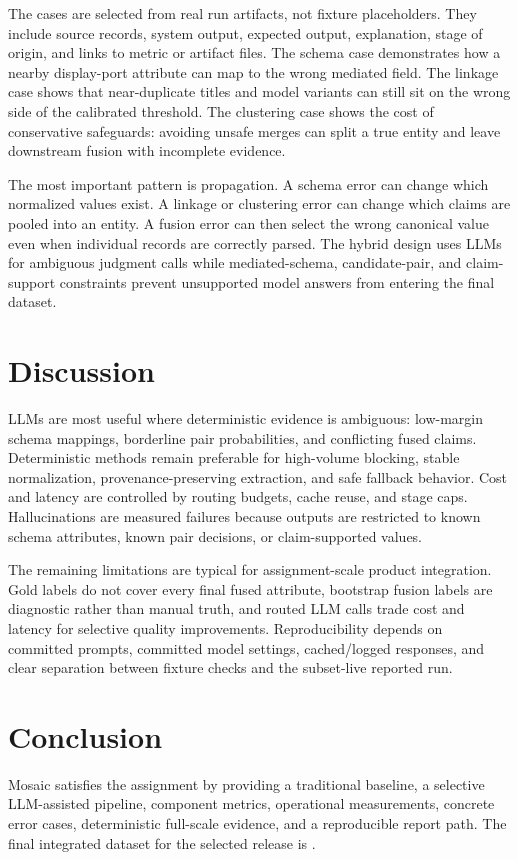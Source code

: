 \documentclass[10pt]{article}
\begin{document}
The cases are selected from real run artifacts, not fixture placeholders. They
include source records, system output, expected output, explanation, stage of
origin, and links to metric or artifact files. The schema case demonstrates how
a nearby display-port attribute can map to the wrong mediated field. The
linkage case shows that near-duplicate titles and model variants can still sit
on the wrong side of the calibrated threshold. The clustering case shows the
cost of conservative safeguards: avoiding unsafe merges can split a true entity
and leave downstream fusion with incomplete evidence.

The most important pattern is propagation. A schema error can change which
normalized values exist. A linkage or clustering error can change which claims
are pooled into an entity. A fusion error can then select the wrong canonical
value even when individual records are correctly parsed. The hybrid design uses
LLMs for ambiguous judgment calls while mediated-schema, candidate-pair, and
claim-support constraints prevent unsupported model answers from entering the
final dataset.

\section{Discussion}
LLMs are most useful where deterministic evidence is ambiguous: low-margin
schema mappings, borderline pair probabilities, and conflicting fused claims.
Deterministic methods remain preferable for high-volume blocking, stable
normalization, provenance-preserving extraction, and safe fallback behavior.
Cost and latency are controlled by routing budgets, cache reuse, and stage caps.
Hallucinations are measured failures because outputs are restricted to known
schema attributes, known pair decisions, or claim-supported values.

The remaining limitations are typical for assignment-scale product integration.
Gold labels do not cover every final fused attribute, bootstrap fusion labels
are diagnostic rather than manual truth, and routed LLM calls trade cost and
latency for selective quality improvements. Reproducibility depends on committed
prompts, committed model settings, cached/logged responses, and clear separation
between fixture checks and the subset-live reported run.

\section{Conclusion}
Mosaic satisfies the assignment by providing a traditional baseline, a selective
LLM-assisted pipeline, component metrics, operational measurements, concrete
error cases, deterministic full-scale evidence, and a reproducible report path.
The final integrated dataset for the selected release is
.
\end{document}
